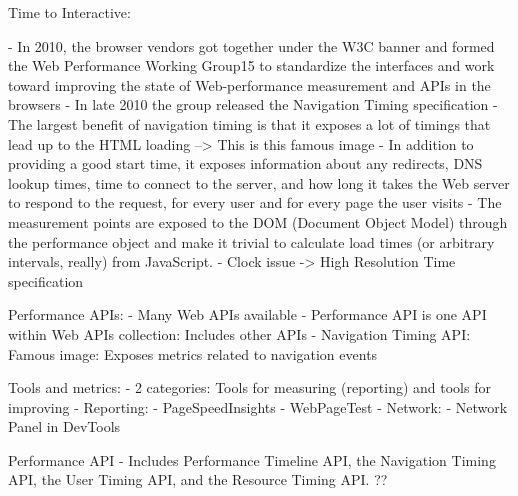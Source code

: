 Time to Interactive: %















- In 2010, the browser vendors got together under the W3C banner and formed the Web Performance Working Group15 to standardize the interfaces and work toward improving the state of Web-performance measurement and APIs in the browsers
- In late 2010 the group released the Navigation Timing specification
- The largest benefit of navigation timing is that it exposes a lot of timings that lead up to the HTML loading --> This is this famous image
- In addition to providing a good start time, it exposes information about any redirects, DNS lookup times, time to connect to the server, and how long it takes the Web server to respond to the request, for every user and for every page the user visits
- The measurement points are exposed to the DOM (Document Object Model) through the performance object and make it trivial to calculate load times (or arbitrary intervals, really) from JavaScript.
- Clock issue -> High Resolution Time specification



Performance APIs:
- Many Web APIs available %
- Performance API is one API within Web APIs collection: Includes other APIs
- Navigation Timing API: Famous image: Exposes metrics related to navigation events

Tools and metrics:
- 2 categories: Tools for measuring (reporting) and tools for improving
- Reporting:
- PageSpeedInsights
- WebPageTest
- Network:
- Network Panel in DevTools





Performance API %
- Includes Performance Timeline API, the Navigation Timing API, the User Timing API, and the Resource Timing API.  ??



